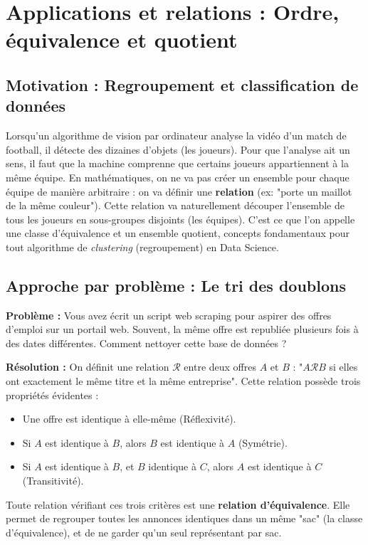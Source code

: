 \documentclass[12pt,a4paper]{report}
\begin{document}
\section{Applications et relations : Ordre, équivalence et quotient}

\subsection{Motivation : Regroupement et classification de données}
Lorsqu'un algorithme de vision par ordinateur analyse la vidéo d'un match de football, il détecte des dizaines d'objets (les joueurs). Pour que l'analyse ait un sens, il faut que la machine comprenne que certains joueurs appartiennent à la même équipe. 
En mathématiques, on ne va pas créer un ensemble pour chaque équipe de manière arbitraire : on va définir une \textbf{relation} (ex: "porte un maillot de la même couleur"). Cette relation va naturellement découper l'ensemble de tous les joueurs en sous-groupes disjoints (les équipes). C'est ce que l'on appelle une classe d'équivalence et un ensemble quotient, concepts fondamentaux pour tout algorithme de \textit{clustering} (regroupement) en Data Science.

\subsection{Approche par problème : Le tri des doublons}
\textbf{Problème :} Vous avez écrit un script web scraping pour aspirer des offres d'emploi sur un portail web. Souvent, la même offre est republiée plusieurs fois à des dates différentes. Comment nettoyer cette base de données ?

\textbf{Résolution :} On définit une relation $\mathcal{R}$ entre deux offres $A$ et $B$ : "$A \mathcal{R} B$ si elles ont exactement le même titre et la même entreprise".
Cette relation possède trois propriétés évidentes :
\begin{itemize}
    \item Une offre est identique à elle-même (Réflexivité).
    \item Si $A$ est identique à $B$, alors $B$ est identique à $A$ (Symétrie).
    \item Si $A$ est identique à $B$, et $B$ identique à $C$, alors $A$ est identique à $C$ (Transitivité).
\end{itemize}
Toute relation vérifiant ces trois critères est une \textbf{relation d'équivalence}. Elle permet de regrouper toutes les annonces identiques dans un même "sac" (la classe d'équivalence), et de ne garder qu'un seul représentant par sac.
\end{document}
